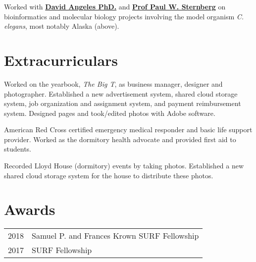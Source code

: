 \documentclass[]{resume}
\begin{document}
\begin{minipage}[t]{0.66\textwidth}
Worked with \textbf{\href{https://dangeles.github.io/}{David Angeles PhD.}} and \textbf{\href{http://wormlab.caltech.edu/LabMembers/Paul}{Prof Paul W. Sternberg}} on bioinformatics and molecular biology projects involving the model organism \textit{C. elegans}, most notably Alaska (above).
\sectionsep


\section{Extracurriculars}
Worked on the yearbook, \textit{The Big T}, as business manager, designer and photographer. Established a new advertisement system, shared cloud storage system, job organization and assignment system, and payment reimbursement system. Designed pages and took/edited photos with Adobe software.
\sectionsep

American Red Cross certified emergency medical responder and basic life support provider. Worked as the dormitory health advocate and provided first aid to students.
\sectionsep

\vspace{-1em}
Recorded Lloyd House (dormitory) events by taking photos. Established a new shared cloud storage system for the house to distribute these photos.
\sectionsep


\section{Awards}
\begin{tabular}{rl}
2018     & Samuel P. and Frances Krown SURF Fellowship  \\
2017     & SURF Fellowship \\
\end{tabular}
\sectionsep


% 
% 

\end{minipage}
\end{document}
